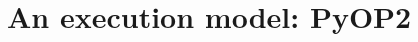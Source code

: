 \documentclass[thesis]{subfiles}
\begin{document}


%
%
%
%
%



\section{An execution model: PyOP2}
\end{document}
